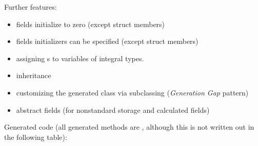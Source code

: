 Further features:

\begin{itemize}
  \item  fields initialize to zero (except struct members)
  \item  fields initializers can be specified (except struct members)
  \item  assigning s to variables of integral types.
  \item  inheritance
  \item  customizing the generated class via subclassing (\textit{Generation Gap} pattern)
  \item  abstract fields (for nonstandard storage and calculated fields)
\end{itemize}

Generated code (all generated methods are , although
this is not written out in the following table):

